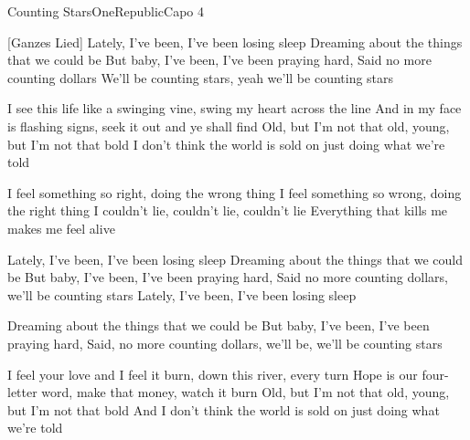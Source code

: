 \begin{song}{Counting Stars}{OneRepublic}{Capo 4}

[Ganzes Lied]
Lately, I've been, I've been losing sleep
Dreaming about the things that we could be
But baby, I've been, I've been praying hard,
Said no more counting dollars
We'll be counting stars, yeah we'll be counting stars


I see this life like a swinging vine, swing my heart across the line
And in my face is flashing signs, seek it out and ye shall find
Old, but I'm not that old, young, but I'm not that bold
I don't think the world is sold on just doing what we're told

I feel something so right, doing the wrong thing
I feel something so wrong, doing the right thing
I couldn't lie, couldn't lie, couldn't lie
Everything that kills me makes me feel alive

Lately, I've been, I've been losing sleep
Dreaming about the things that we could be
But baby, I've been, I've been praying hard,
Said no more counting dollars, we'll be counting stars
Lately, I've been, I've been losing sleep

Dreaming about the things that we could be
But baby, I've been, I've been praying hard,
Said, no more counting dollars, we'll be, we'll be counting stars


I feel your love and I feel it burn, down this river, every turn
Hope is our four-letter word, make that money, watch it burn
Old, but I'm not that old, young, but I'm not that bold
And I don't think the world is sold on just doing what we're told


\end{song}
